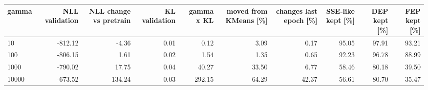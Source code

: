 \begin{tabular}{lrrrrrrrrr}
\hline
gamma & NLL validation & NLL change vs pretrain & KL validation & gamma x KL & moved from KMeans [\%] & changes last epoch [\%] & SSE-like kept [\%] & DEP kept [\%] & FEP kept [\%] \\
\hline
10 & -812.12 & -4.36 & 0.01 & 0.12 & 3.09 & 0.17 & 95.05 & 97.91 & 93.21 \\
100 & -806.15 & 1.61 & 0.02 & 1.54 & 1.35 & 0.65 & 92.23 & 96.78 & 88.99 \\
1000 & -790.02 & 17.75 & 0.04 & 40.27 & 33.50 & 6.77 & 58.46 & 80.18 & 39.50 \\
10000 & -673.52 & 134.24 & 0.03 & 292.15 & 64.29 & 42.37 & 56.61 & 80.70 & 35.47 \\
\hline
\end{tabular}
